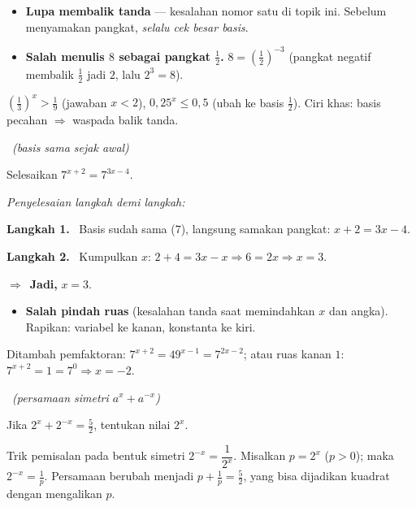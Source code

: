 \documentclass[11pt,a4paper]{report}
\theoremstyle{gaya}
\newcommand{\jawab}{\par\smallskip\noindent\textit{\textcolor{oranye}{Penyelesaian langkah demi langkah:}}\par\smallskip}
\newcommand{\langkah}[1]{\par\smallskip\noindent\textbf{\textcolor{biru}{Langkah #1.}}\ }
\newcommand{\jadi}{\par\smallskip\noindent$\Rightarrow$\ \textbf{Jadi, }}
\newcommand{\soalno}[2]{%
  \par\bigskip
  \noindent{\large\bfseries\color{ungu}\rule[-2pt]{4pt}{14pt}\ Soal #1}%
  \ {\normalfont\itshape\color{gray}(#2)}\par\nopagebreak\smallskip}
\begin{document}
\begin{jebakan}
\begin{itemize}[leftmargin=*,topsep=2pt]
  \item \textbf{Lupa membalik tanda} --- kesalahan nomor satu di topik ini.
  Sebelum menyamakan pangkat, \emph{selalu cek besar basis}.
  \item \textbf{Salah menulis $8$ sebagai pangkat $\tfrac12$.}
  $8=\left(\tfrac12\right)^{-3}$ (pangkat negatif membalik $\tfrac12$ jadi $2$,
  lalu $2^3=8$).
\end{itemize}
\end{jebakan}

\begin{variasi}
$\left(\tfrac13\right)^x>\tfrac19$ (jawaban $x<2$), $0{,}25^{x}\le 0{,}5$
(ubah ke basis $\tfrac12$). Ciri khas: basis pecahan $\Rightarrow$ waspada balik
tanda.
\end{variasi}

\soalno{1.2.7}{basis sama sejak awal}
\begin{soalbox}{}
Selesaikan $7^{x+2} = 7^{3x-4}$.
\end{soalbox}

\jawab
\langkah{1} Basis sudah sama ($7$), langsung samakan pangkat:
$x+2 = 3x-4$.
\langkah{2} Kumpulkan $x$: $2+4 = 3x - x \Rightarrow 6 = 2x \Rightarrow x=3$.
\jadi $x=3$.

\begin{jebakan}
\begin{itemize}[leftmargin=*,topsep=2pt]
  \item \textbf{Salah pindah ruas} (kesalahan tanda saat memindahkan $x$ dan
  angka). Rapikan: variabel ke kanan, konstanta ke kiri.
\end{itemize}
\end{jebakan}

\begin{variasi}
Ditambah pemfaktoran: $7^{x+2}=49^{x-1}=7^{2x-2}$; atau ruas kanan $1$:
$7^{x+2}=1=7^0\Rightarrow x=-2$.
\end{variasi}

\soalno{1.2.8}{persamaan simetri $a^x+a^{-x}$}
\begin{soalbox}{}
Jika $2^{x}+2^{-x} = \tfrac52$, tentukan nilai $2^{x}$.
\end{soalbox}

\begin{ingat}{Trik pemisalan pada bentuk simetri}
$2^{-x}=\dfrac{1}{2^{x}}$. Misalkan $p=2^x$ ($p>0$); maka $2^{-x}=\frac1p$.
Persamaan berubah menjadi $p+\frac1p=\frac52$, yang bisa dijadikan kuadrat dengan
mengalikan $p$.
\end{ingat}
\end{document}

